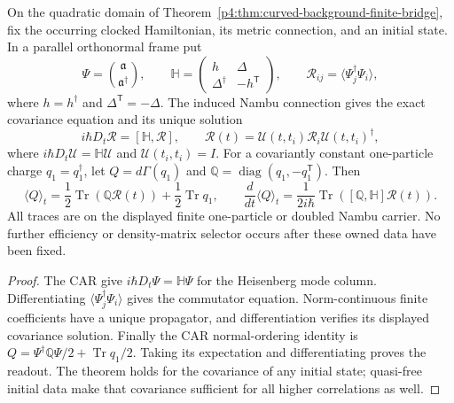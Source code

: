 \documentclass[12pt,a4paper]{article}
\begin{document}
\begin{theorem}
\label{p4:thm:v4102-finite-car-charge-propagation}
On the quadratic domain of
Theorem~\ref{p4:thm:curved-background-finite-bridge}, fix the occurring clocked
Hamiltonian, its metric connection, and an initial state.  In a parallel
orthonormal frame put
\[
 \Psi=\binom{\mathfrak a}{\mathfrak a^\dagger},\qquad
 \mathbb H=
 \begin{pmatrix}h&\Delta\\\Delta^\dagger&-h^{\mathsf T}\end{pmatrix},
 \qquad
 \mathcal R_{ij}=\langle\Psi_j^\dagger\Psi_i\rangle,
\]
where $h=h^\dagger$ and $\Delta^{\mathsf T}=-\Delta$.  The induced Nambu
connection gives the exact covariance equation and its unique solution
\begin{equation}
\label{p4:eq:v4102-covariance-propagation}
 \boxed{
 i\hbar D_t\mathcal R=[\mathbb H,\mathcal R],\qquad
 \mathcal R(t)=\mathcal U(t,t_i)\mathcal R_i\mathcal U(t,t_i)^\dagger,}
\end{equation}
where $i\hbar D_t\mathcal U=\mathbb H\mathcal U$ and
$\mathcal U(t_i,t_i)=I$.  For a covariantly constant one-particle charge
$q_1=q_1^\dagger$, let
$Q=d\Gamma(q_1)$ and $\mathbb Q=\operatorname{diag}(q_1,-q_1^{\mathsf T})$.
Then
\begin{equation}
\label{p4:eq:v4102-covariance-charge-readout}
 \boxed{
 \langle Q\rangle_t
 =\frac12\operatorname{Tr}(\mathbb Q\mathcal R(t))
  +\frac12\operatorname{Tr}q_1,\qquad
 \frac{d}{dt}\langle Q\rangle_t
 =\frac1{2i\hbar}
   \operatorname{Tr}([\mathbb Q,\mathbb H]\mathcal R(t)).}
\end{equation}
All traces are on the displayed finite one-particle or doubled Nambu carrier.
No further efficiency or density-matrix selector occurs after these owned
data have been fixed.
\end{theorem}

\begin{proof}
The CAR give $i\hbar D_t\Psi=\mathbb H\Psi$ for the Heisenberg mode column.
Differentiating $\langle\Psi_j^\dagger\Psi_i\rangle$ gives the commutator
equation.  Norm-continuous finite coefficients have a unique propagator, and
differentiation verifies its displayed covariance solution.  Finally the CAR
normal-ordering identity is
$Q=\Psi^\dagger\mathbb Q\Psi/2+\operatorname{Tr}q_1/2$.
Taking its expectation and differentiating proves the readout.  The theorem
holds for the covariance of any initial state; quasi-free initial data make
that covariance sufficient for all higher correlations as well.
\end{proof}
\end{document}
